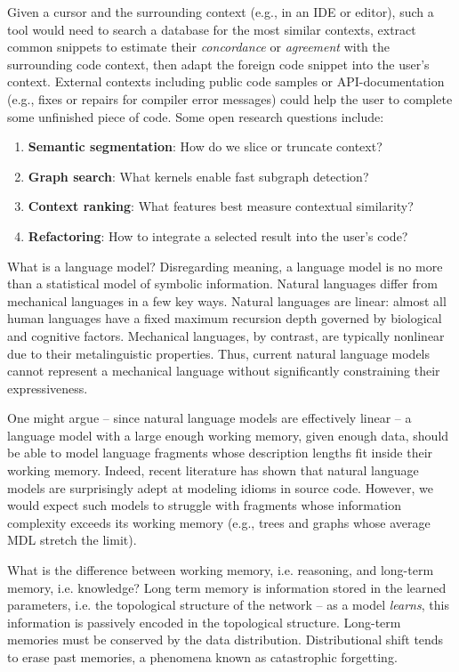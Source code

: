 \documentclass[10pt]{article}
\begin{document}
Given a cursor and the surrounding context (e.g., in an IDE or editor), such a tool would need to search a database for the most similar contexts, extract common snippets to estimate their \textit{concordance} or \textit{agreement} with the surrounding code context, then adapt the foreign code snippet into the user's context. External contexts including public code samples or API-documentation (e.g., fixes or repairs for compiler error messages) could help the user to complete some unfinished piece of code. Some open research questions include:

  \begin{enumerate}
    \item \textbf{Semantic segmentation}: How do we slice or truncate context?
    \item \textbf{Graph search}: What kernels enable fast subgraph detection?
    \item \textbf{Context ranking}: What features best measure contextual similarity?
    \item \textbf{Refactoring}: How to integrate a selected result into the user's code?
  \end{enumerate}

What is a language model? Disregarding meaning, a language model is no more than a statistical model of symbolic information. Natural languages differ from mechanical languages in a few key ways. Natural languages are linear: almost all human languages have a fixed maximum recursion depth governed by biological and cognitive factors. Mechanical languages, by contrast, are typically nonlinear due to their metalinguistic properties. Thus, current natural language models cannot represent a mechanical language without significantly constraining their expressiveness.

One might argue -- since natural language models are effectively linear -- a language model with a large enough working memory, given enough data, should be able to model language fragments whose description lengths fit inside their working memory. Indeed, recent literature has shown that natural language models are surprisingly adept at modeling idioms in source code. However, we would expect such models to struggle with fragments whose information complexity exceeds its working memory (e.g., trees and graphs whose average MDL stretch the limit).

What is the difference between working memory, i.e. reasoning, and long-term memory, i.e. knowledge? Long term memory is information stored in the learned parameters, i.e. the topological structure of the network -- as a model \textit{learns}, this information is passively encoded in the topological structure. Long-term memories must be conserved by the data distribution. Distributional shift tends to erase past memories, a phenomena known as catastrophic forgetting.
\end{document}
